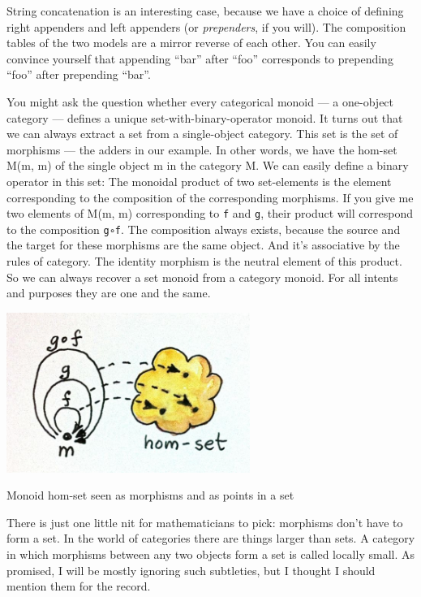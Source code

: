 String concatenation is an interesting case, because we have a choice of
defining right appenders and left appenders (or \emph{prependers}, if
you will). The composition tables of the two models are a mirror reverse
of each other. You can easily convince yourself that appending ``bar''
after ``foo'' corresponds to prepending ``foo'' after prepending
``bar''.

You might ask the question whether every categorical monoid --- a
one-object category --- defines a unique set-with-binary-operator
monoid. It turns out that we can always extract a set from a
single-object category. This set is the set of morphisms --- the adders
in our example. In other words, we have the hom-set M(m, m) of the
single object m in the category M. We can easily define a binary
operator in this set: The monoidal product of two set-elements is the
element corresponding to the composition of the corresponding morphisms.
If you give me two elements of M(m, m) corresponding to \texttt{f} and
\texttt{g}, their product will correspond to the composition
\texttt{g∘f}. The composition always exists, because the source and the
target for these morphisms are the same object. And it's associative by
the rules of category. The identity morphism is the neutral element of
this product. So we can always recover a set monoid from a category
monoid. For all intents and purposes they are one and the same.

\hypertarget{attachment_3681}{}
\includegraphics[width=3.12500in]{images/monoidhomset.jpg}

Monoid hom-set seen as morphisms and as points in a set

There is just one little nit for mathematicians to pick: morphisms don't
have to form a set. In the world of categories there are things larger
than sets. A category in which morphisms between any two objects form a
set is called locally small. As promised, I will be mostly ignoring such
subtleties, but I thought I should mention them for the record.


